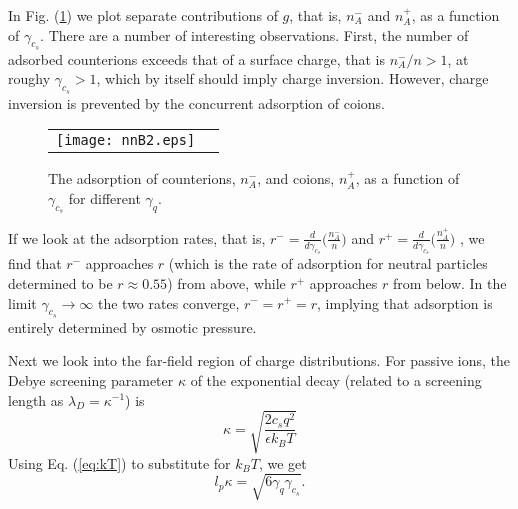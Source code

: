 \documentclass[pre,twocolumn,graphicx]{revtex4-1}
\newcommand{\be}{\begin{equation}}
\newcommand{\ee}{\end{equation}}
\begin{document}
In Fig. (\ref{fig:nA}) we plot separate contributions of $g$, that is, $n_A^-$ and $n_A^+$, as a function 
of $\gamma_{c_s}$.  There are a number of interesting observations.  First, the number of adsorbed counterions 
exceeds that of a surface charge, that is $n_A^-/n>1$, at roughy $\gamma_{c_s}>1$, which by itself should 
imply charge inversion.  However, charge inversion is prevented by the concurrent adsorption of coions.  
\graphicspath{{figures/}}
\begin{figure}[h] 
 \begin{center}
 \begin{tabular}{rr}
  \texttt{[image: nnB2.eps]}
 \end{tabular}
 \end{center}
\caption{The adsorption of counterions, $n_A^-$, and coions, $n_A^+$, as a function of $\gamma_{c_s}$ for 
different $\gamma_q$. } 
\label{fig:nA}
\end{figure}
If we look at the adsorption rates, that is, $r^-=\frac{d}{d\gamma_{c_s}}\big(\frac{n_A^-}{n}\big)$ and 
$r^+=\frac{d}{d\gamma_{c_s}}\big(\frac{n_A^+}{n}\big)$ , we find that $r^-$ approaches $r$ (which is the rate of 
adsorption for neutral particles determined to be $r\approx 0.55$) from above, while $r^+$ approaches $r$ from 
below.  In the limit $\gamma_{c_s}\to\infty$ the two rates converge, $r^-=r^+=r$, implying that adsorption is 
entirely determined by osmotic pressure.


 




Next we look into the far-field region of charge distributions.  
For passive ions, the Debye screening parameter $\kappa$ of the exponential decay 
(related to a screening length as $\lambda_D=\kappa^{-1}$) is 
\be
\kappa = \sqrt{\frac{2c_s q^2}{\epsilon k_BT}}
\ee
Using Eq. (\ref{eq:kT}) to substitute for $k_BT$, we get 
\be
l_p \kappa 
=  \sqrt{6\gamma_q \gamma_{c_s}}.  
\label{eq:kappa}
\ee
\end{document}
